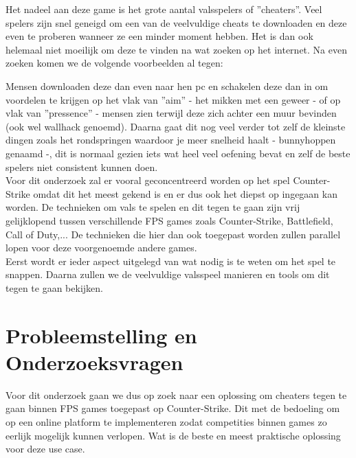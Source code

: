 \documentclass[pdftex,a4paper,12pt,twoside]{report}
\begin{document}
Het nadeel aan deze game is het grote aantal valsspelers of ''cheaters''. Veel spelers zijn snel geneigd om een van de veelvuldige cheats te downloaden en deze even te proberen wanneer ze een minder moment hebben. Het is dan ook helemaal niet moeilijk om deze te vinden na wat zoeken op het internet. Na even zoeken komen we de volgende voorbeelden al tegen:

 Mensen downloaden deze dan even naar hen pc en schakelen deze dan in om voordelen te krijgen op het vlak van ''aim'' - het mikken met een geweer - of op vlak van ''pressence'' - mensen zien terwijl deze zich achter een muur bevinden (ook wel wallhack genoemd). Daarna gaat dit nog veel verder tot zelf de kleinste dingen zoals het rondspringen waardoor je meer snelheid haalt - bunnyhoppen genaamd -, dit is normaal gezien iets wat heel veel oefening bevat en zelf de beste spelers niet consistent kunnen doen. 
\\

Voor dit onderzoek zal er vooral geconcentreerd worden op het spel Counter-Strike omdat dit het meest gekend is en er dus ook het diepst op ingegaan kan worden. De technieken om vals te spelen en dit tegen te gaan zijn vrij gelijklopend tussen verschillende FPS games zoals Counter-Strike, Battlefield, Call of Duty,... De technieken die hier dan ook toegepast worden zullen parallel lopen voor deze voorgenoemde andere games.
\\

Eerst wordt er ieder aspect uitgelegd van wat nodig is te weten om het spel te snappen. Daarna zullen we de veelvuldige valsspeel manieren en tools om dit tegen te gaan bekijken.


\section{Probleemstelling en Onderzoeksvragen}
\label{sec:onderzoeksvragen}

Voor dit onderzoek gaan we dus op zoek naar een oplossing om cheaters tegen te gaan binnen FPS games toegepast op Counter-Strike. Dit met de bedoeling om op een online platform te implementeren zodat competities binnen games zo eerlijk mogelijk kunnen verlopen. Wat is de beste en meest praktische oplossing voor deze use case. 
\\
\end{document}
